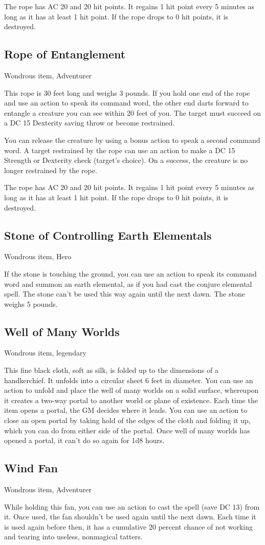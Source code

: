 The rope has AC 20 and 20 hit points. It regains 1 hit point every 5 minutes as long as it has at least 1 hit point. If the rope drops to 0 hit points, it is destroyed.

\subsection{Rope of Entanglement}
Wondrous item, Adventurer

This rope is 30 feet long and weighs 3 pounds. If you hold one end of the rope and use an action to speak its command word, the other end darts forward to entangle a creature you can see within 20 feet of you. The target must succeed on a DC 15 Dexterity saving throw or become restrained.

You can release the creature by using a bonus action to speak a second command word. A target restrained by the rope can use an action to make a DC 15 Strength or Dexterity check (target's choice). On a success, the creature is no longer restrained by the rope.

The rope has AC 20 and 20 hit points. It regains 1 hit point every 5 minutes as long as it has at least 1 hit point. If the rope drops to 0 hit points, it is destroyed. 

\subsection{Stone of Controlling Earth Elementals}
Wondrous item, Hero 

If the stone is touching the ground, you can use an action to speak its command word and summon an earth elemental, as if you had cast the conjure elemental spell. The stone can't be used this way again until the next dawn. The stone weighs 5 pounds.

\subsection{Well of Many Worlds}
Wondrous item, legendary

This fine black cloth, soft as silk, is folded up to the dimensions of a handkerchief. It unfolds into a circular sheet 6 feet in diameter. You can use an action to unfold and place the well of many worlds on a solid surface, whereupon it creates a two-way portal to another world or plane of existence. Each time the item opens a portal, the GM decides where it leads. You can use an action to close an open portal by taking hold of the edges of the cloth and folding it up, which you can do from either side of the portal. Once well of many worlds has opened a portal, it can't do so again for 1d8 hours.

\subsection{Wind Fan}
Wondrous item, Adventurer

While holding this fan, you can use an action to cast the  spell (save DC 13) from it. Once used, the fan shouldn't be used again until the next dawn. Each time it is used again before then, it has a cumulative 20 percent chance of not working and tearing into useless, nonmagical tatters.